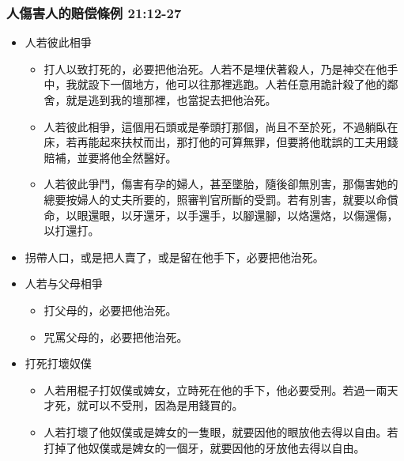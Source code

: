 \subsubsection{人傷害人的赔偿條例 21:12-27}
\begin{itemize} 
\itemsep-.35em
\item 人若彼此相爭
\begin{itemize} 
\itemsep-.35em
\item 打人以致打死的，必要把他治死。人若不是埋伏著殺人，乃是神交在他手中，我就設下一個地方，他可以往那裡逃跑。人若任意用詭計殺了他的鄰舍，就是逃到我的壇那裡，也當捉去把他治死。
\item 人若彼此相爭，這個用石頭或是拳頭打那個，尚且不至於死，不過躺臥在床，若再能起來扶杖而出，那打他的可算無罪，但要將他耽誤的工夫用錢賠補，並要將他全然醫好。
\item 人若彼此爭鬥，傷害有孕的婦人，甚至墜胎，隨後卻無別害，那傷害她的總要按婦人的丈夫所要的，照審判官所斷的受罰。若有別害，就要以命償命，以眼還眼，以牙還牙，以手還手，以腳還腳，以烙還烙，以傷還傷，以打還打。
\end{itemize}
\item 拐帶人口，或是把人賣了，或是留在他手下，必要把他治死。
\item 人若与父母相爭
\begin{itemize} 
\itemsep-.35em
\item 打父母的，必要把他治死。
\item 咒罵父母的，必要把他治死。
\end{itemize}
\item 打死打壞奴僕
\begin{itemize} 
\itemsep-.35em
\item 人若用棍子打奴僕或婢女，立時死在他的手下，他必要受刑。若過一兩天才死，就可以不受刑，因為是用錢買的。
\item 人若打壞了他奴僕或是婢女的一隻眼，就要因他的眼放他去得以自由。若打掉了他奴僕或是婢女的一個牙，就要因他的牙放他去得以自由。
\end{itemize}
\end{itemize}

